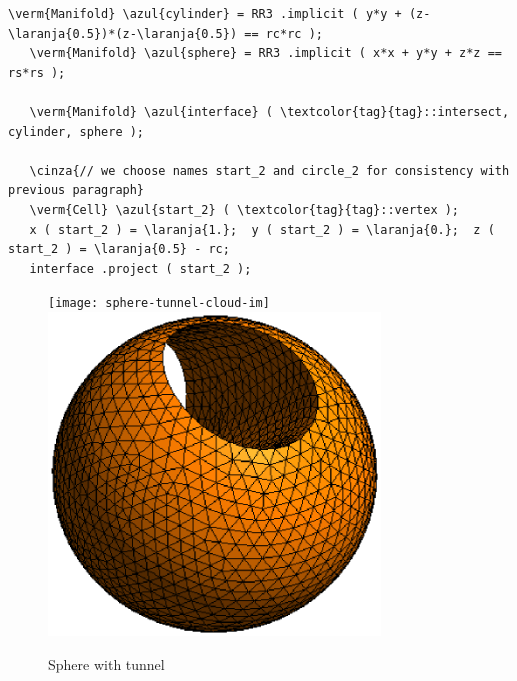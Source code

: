 \begin{Verbatim}[commandchars=\\\{\},formatcom=\small\tt,frame=single,
   label=parag-\ref{\numb section 3.\numb parag 20}.cpp,rulecolor=\color{moldura},
   baselinestretch=0.94,framesep=2mm                                              ]
   \verm{Manifold} \azul{cylinder} = RR3 .implicit ( y*y + (z-\laranja{0.5})*(z-\laranja{0.5}) == rc*rc );
   \verm{Manifold} \azul{sphere} = RR3 .implicit ( x*x + y*y + z*z == rs*rs );

   \verm{Manifold} \azul{interface} ( \textcolor{tag}{tag}::intersect, cylinder, sphere );

   \cinza{// we choose names start_2 and circle_2 for consistency with previous paragraph}
   \verm{Cell} \azul{start_2} ( \textcolor{tag}{tag}::vertex );
   x ( start_2 ) = \laranja{1.};  y ( start_2 ) = \laranja{0.};  z ( start_2 ) = \laranja{0.5} - rc;
   interface .project ( start_2 );
\end{Verbatim}

\begin{figure}[ht] \centering
\if{}
 \texttt{[image: sphere-tunnel-cloud-im]}
\else
 \includegraphics[width=88mm]{sphere-tunnel-low-res}
\fi
  \caption{Sphere with tunnel}
  \label{\numb section 3.\numb fig 8}
\end{figure}

